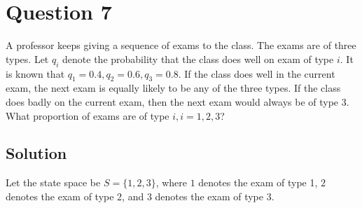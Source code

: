 \section*{Question 7}

A professor keeps giving a sequence of exams to the class.
The exams are of three types.
Let \( q_{i} \) denote the probability that the class does well on exam of type \( i \).
It is known that \( q_{1}=0.4, q_{2}=0.6, q_{3}=0.8 \).
If the class does well in the current exam, the next exam is equally likely to be any of the three types.
If the class does badly on the current exam, then the next exam would always be of type 3.
What proportion of exams are of type \( i, i=1,2,3 \)?

\subsection*{Solution}

Let the state space be \( S = \{ 1, 2, 3 \} \), where \( 1 \) denotes the exam of type 1, \( 2 \) denotes the exam of type 2, and \( 3 \) denotes the exam of type 3.

